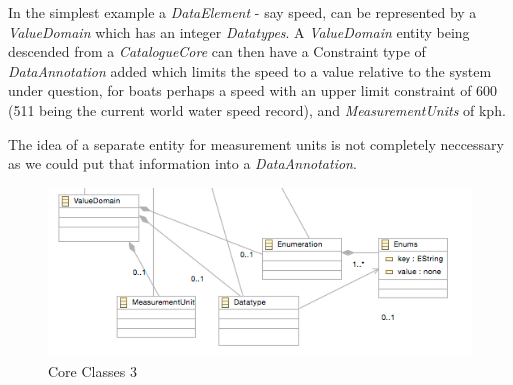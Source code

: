 \documentclass{article}
\begin{document}
In the simplest example a \emph{DataElement} - say speed, can be represented by a \emph{ValueDomain} which has an integer \emph{Datatypes}. A  \emph{ValueDomain} entity being descended from a \emph{CatalogueCore} can then have a Constraint type of \emph{DataAnnotation} added which limits the speed to a value relative to the system under question, for boats perhaps a speed with an upper limit constraint of 600 (511 being the current world water speed record), and \emph{MeasurementUnits} of kph. 

The idea of a separate entity for measurement units is not completely neccessary as we could put that information into a \emph{DataAnnotation}.


\begin{figure}[here]
\includegraphics[scale=0.4]{images/core3}
\caption{Core Classes 3} 
\label{fig:core3}
\end{figure}
\end{document}
